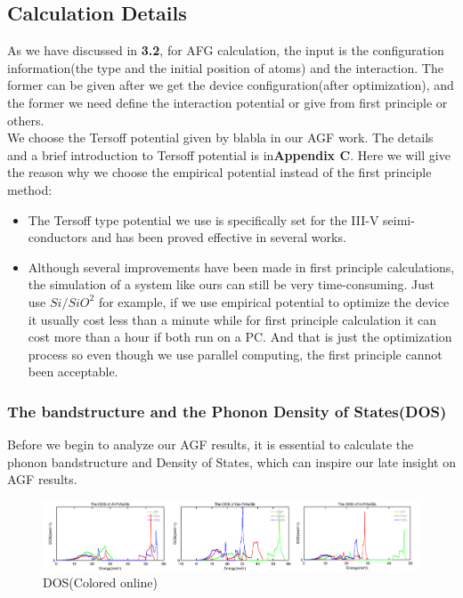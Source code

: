 \subsection{Calculation Details}
As we have discussed in \textbf{3.2}, for AFG calculation, the input is the configuration information(the type and the initial position of atoms) and the interaction. The former can be given after we get the device configuration(after optimization), and the former we need define the interaction potential or give from first principle or others. \\
\indent We choose the Tersoff potential given by blabla in our AGF work. The details and a brief introduction to Tersoff potential is in\textbf{Appendix C}. Here we will give the reason why we choose the empirical potential instead of the first principle method:
\begin{itemize}
\item The Tersoff type potential\cite{TeroffIIIV} we use is specifically set for the III-V seimi-conductors and has been proved effective in several works\cite{tersoffwork1,tersoffwork2,teroffwork3,tersoffwork4}.
\item Although several improvements have been made in first principle calculations, the simulation of a system like ours can still be very time-consuming. Just use $Si/SiO^2$ for example, if we use empirical potential to optimize the device it usually cost less than a minute while for first principle calculation it can cost more than a hour if both run on a PC. And that is just the optimization process so even though we use
parallel computing, the first principle cannot been acceptable.
\end{itemize}
\subsubsection*{The bandstructure and the Phonon Density of States(DOS)}
Before we begin to analyze our AGF results, it is essential  to calculate the phonon bandstructure and Density of States, which can inspire our late insight on AGF results.

\begin{figure}

\centering
\includegraphics[width=\textwidth]{dos.png}
\caption{DOS(Colored online)}
\label{fig:dosall}
\end{figure}

